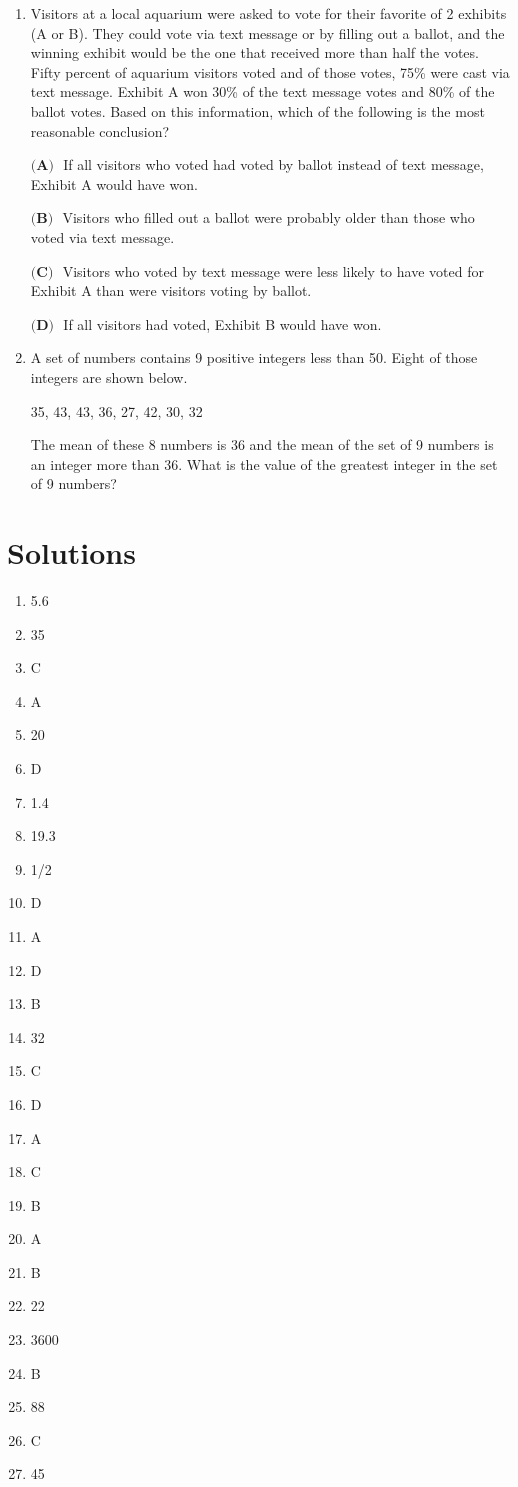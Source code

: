 \documentclass[../satmath.tex]{subfiles}
\begin{document}
\begin{enumerate}[label=\bfseries\arabic*.]
\item Visitors at a local aquarium were asked to vote for their favorite of 2 exhibits (A or B). They could vote via text message or by filling out a ballot, 
and the winning exhibit would be the one that received more than half the votes. Fifty percent of aquarium visitors voted and of those votes, 75\% 
were cast via text message. Exhibit A won 30\% of the text message votes and 80\% of the ballot votes. Based on this information, which of the following is the most 
reasonable conclusion?

$\textbf{(A) }$ If all visitors who voted had voted by ballot instead of text message, Exhibit A would have won.

$\textbf{(B) }$ Visitors who filled out a ballot were probably older than those who voted via text message.

$\textbf{(C) }$ Visitors who voted by text message were less likely to have voted for Exhibit A than were visitors voting by ballot.

$\textbf{(D) }$ If all visitors had voted, Exhibit B would have won.

\item A set of numbers contains 9 positive integers less than 50. Eight of those integers are shown below.
\begin{center}
    35, 43, 43, 36, 27, 42, 30, 32
\end{center}
The mean of these 8 numbers is 36 and the mean of the set of 9 numbers is an integer more than 36. What is the value of the greatest integer in the set of 9 numbers?
\end{enumerate}

\section*{Solutions}
\begin{enumerate}[label=\bfseries\arabic*.]
\item 5.6
\item 35
\item C
\item A
\item 20
\item D
\item 1.4
\item 19.3
\item 1/2
\item D
\item A
\item D
\item B
\item 32
\item C
\item D
\item A
\item C
\item B
\item A
\item B
\item 22
\item 3600
\item B
\item 88
\item C
\item 45
\end{enumerate}
\end{document}

